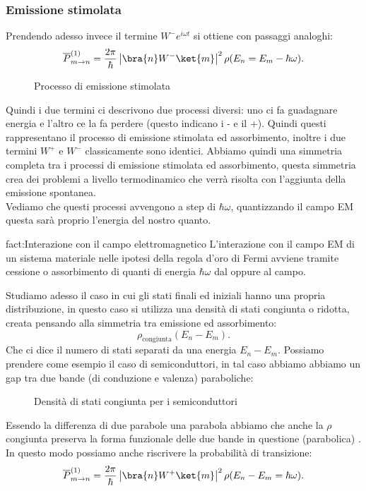 \subsubsection{Emissione stimolata}%
Prendendo adesso invece il termine $W^-e^{i\omega t}$ si ottiene con passaggi analoghi:
\[
    \overline{P}^{(1)}_{m\to n} = \frac{2\pi}{\hbar }\left|\bra{n}W^- \ket{m}\right|^2\rho(E_n=E_m-\hbar \omega) 
.\] 
\begin{figure}[H]
    \centering
    \caption{Processo di emissione stimolata}
    \label{fig:processo-di-emissione}
\end{figure}
\noindent
Quindi i due termini ci descrivono due processi diversi: uno ci fa guadagnare energia e l'altro ce la fa perdere (questo indicano i - e il +). Quindi questi rappresentano il processo di emissione stimolata ed assorbimento, inoltre i due termini $W^+$ e $W^-$ classicamente sono identici. Abbiamo quindi una simmetria completa tra i processi di emissione stimolata ed assorbimento, questa simmetria crea dei problemi a livello termodinamico che verrà risolta con l'aggiunta della emissione spontanea.\\
Vediamo che questi processi avvengono a step di $\hbar \omega$, quantizzando il campo EM questa sarà proprio l'energia del nostro quanto.
\begin{fact}{fact:Interazione con il campo elettromagnetico}
L'interazione con il campo EM di un sistema materiale nelle ipotesi della regola d'oro di Fermi avviene tramite cessione o assorbimento di quanti di energia $\hbar \omega$ dal oppure al campo.
\end{fact}
Studiamo adesso il caso in cui gli stati finali ed iniziali hanno una propria distribuzione, in questo caso si utilizza una densità di stati congiunta o ridotta, creata pensando alla simmetria tra emissione ed assorbimento:
\[
    \rho_\text{congiunta} (E_n-E_m) 
.\] 
Che ci dice il numero di stati separati da una energia $E_n-E_m$. Possiamo prendere come esempio il caso di semiconduttori, in tal caso abbiamo abbiamo un gap tra due bande (di conduzione e valenza) paraboliche:
\begin{figure}[H]
    \centering
    \caption{Densità di stati congiunta per i semiconduttori}
    \label{fig:densità-di-stati-congiunta-per-i-semiconduttori}
\end{figure}
\noindent
Essendo la differenza di due parabole una parabola abbiamo che anche la $\rho$ congiunta preserva la forma funzionale delle due bande in questione (parabolica) .
In questo modo possiamo anche riscrivere la probabilità di transizione:
\[
    \overline{P}^{(1)}_{m\to n} = \frac{2\pi}{\hbar }\left|\bra{n}W^+ \ket{m}\right|^2\rho(E_n-E_m=\hbar \omega) 
.\] 
